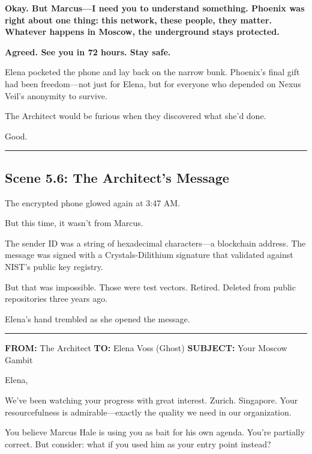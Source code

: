 \textbf{Okay. But Marcus---I need you to understand something. Phoenix was right about one thing: this network, these people, they matter. Whatever happens in Moscow, the underground stays protected.}

\textbf{Agreed. See you in 72 hours. Stay safe.}

Elena pocketed the phone and lay back on the narrow bunk. Phoenix's final gift had been freedom---not just for Elena, but for everyone who depended on Nexus Veil's anonymity to survive.

The Architect would be furious when they discovered what she'd done.

Good.

\begin{center}\rule{0.5\linewidth}{0.5pt}\end{center}

\hypertarget{scene-5.6-the-architects-message}{%
\subsection{Scene 5.6: The Architect's Message}\label{scene-5.6-the-architects-message}}

The encrypted phone glowed again at 3:47 AM.

But this time, it wasn't from Marcus.

The sender ID was a string of hexadecimal characters---a blockchain address. The message was signed with a Crystals-Dilithium signature that validated against NIST's public key registry.

But that was impossible. Those were test vectors. Retired. Deleted from public repositories three years ago.

Elena's hand trembled as she opened the message.

\begin{center}\rule{0.5\linewidth}{0.5pt}\end{center}

\textbf{FROM:} The Architect \textbf{TO:} Elena Voss (Ghost) \textbf{SUBJECT:} Your Moscow Gambit

Elena,

We've been watching your progress with great interest. Zurich. Singapore. Your resourcefulness is admirable---exactly the quality we need in our organization.

You believe Marcus Hale is using you as bait for his own agenda. You're partially correct. But consider: what if you used him as your entry point instead?

